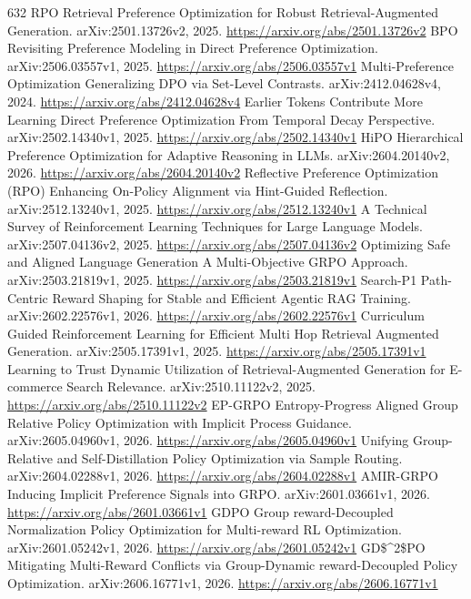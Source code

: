 \documentclass[11pt]{article}
\begin{document}
\begin{thebibliography}{632}
 RPO Retrieval Preference Optimization for Robust Retrieval-Augmented Generation. arXiv:2501.13726v2, 2025. \url{https://arxiv.org/abs/2501.13726v2}
 BPO Revisiting Preference Modeling in Direct Preference Optimization. arXiv:2506.03557v1, 2025. \url{https://arxiv.org/abs/2506.03557v1}
 Multi-Preference Optimization Generalizing DPO via Set-Level Contrasts. arXiv:2412.04628v4, 2024. \url{https://arxiv.org/abs/2412.04628v4}
 Earlier Tokens Contribute More Learning Direct Preference Optimization From Temporal Decay Perspective. arXiv:2502.14340v1, 2025. \url{https://arxiv.org/abs/2502.14340v1}
 HiPO Hierarchical Preference Optimization for Adaptive Reasoning in LLMs. arXiv:2604.20140v2, 2026. \url{https://arxiv.org/abs/2604.20140v2}
 Reflective Preference Optimization (RPO) Enhancing On-Policy Alignment via Hint-Guided Reflection. arXiv:2512.13240v1, 2025. \url{https://arxiv.org/abs/2512.13240v1}
 A Technical Survey of Reinforcement Learning Techniques for Large Language Models. arXiv:2507.04136v2, 2025. \url{https://arxiv.org/abs/2507.04136v2}
 Optimizing Safe and Aligned Language Generation A Multi-Objective GRPO Approach. arXiv:2503.21819v1, 2025. \url{https://arxiv.org/abs/2503.21819v1}
 Search-P1 Path-Centric Reward Shaping for Stable and Efficient Agentic RAG Training. arXiv:2602.22576v1, 2026. \url{https://arxiv.org/abs/2602.22576v1}
 Curriculum Guided Reinforcement Learning for Efficient Multi Hop Retrieval Augmented Generation. arXiv:2505.17391v1, 2025. \url{https://arxiv.org/abs/2505.17391v1}
 Learning to Trust Dynamic Utilization of Retrieval-Augmented Generation for E-commerce Search Relevance. arXiv:2510.11122v2, 2025. \url{https://arxiv.org/abs/2510.11122v2}
 EP-GRPO Entropy-Progress Aligned Group Relative Policy Optimization with Implicit Process Guidance. arXiv:2605.04960v1, 2026. \url{https://arxiv.org/abs/2605.04960v1}
 Unifying Group-Relative and Self-Distillation Policy Optimization via Sample Routing. arXiv:2604.02288v1, 2026. \url{https://arxiv.org/abs/2604.02288v1}
 AMIR-GRPO Inducing Implicit Preference Signals into GRPO. arXiv:2601.03661v1, 2026. \url{https://arxiv.org/abs/2601.03661v1}
 GDPO Group reward-Decoupled Normalization Policy Optimization for Multi-reward RL Optimization. arXiv:2601.05242v1, 2026. \url{https://arxiv.org/abs/2601.05242v1}
 GD\$\textasciicircum{}2\$PO Mitigating Multi-Reward Conflicts via Group-Dynamic reward-Decoupled Policy Optimization. arXiv:2606.16771v1, 2026. \url{https://arxiv.org/abs/2606.16771v1}

\end{thebibliography}
\end{document}
